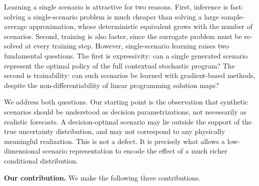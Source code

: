 Learning a single scenario is attractive for two reasons. First, inference is fast: solving a single-scenario problem is much cheaper than solving a large sample-average approximation, whose deterministic equivalent grows with the number of scenarios. Second, training is also faster, since the surrogate problem must be re-solved at every training step. However, single-scenario learning raises two fundamental questions. The first is expressivity: can a single generated scenario represent the optimal policy of the full contextual stochastic program? The second is trainability: can such scenarios be learned with gradient-based methods, despite the non-differentiability of linear programming solution maps?

We address both questions. Our starting point is the observation that synthetic scenarios should be understood as decision parametrizations, not necessarily as realistic forecasts. A decision-optimal scenario may lie outside the support of the true uncertainty distribution, and may not correspond to any physically meaningful realization. This is not a defect. It is precisely what allows a low-dimensional scenario representation to encode the effect of a much richer conditional distribution.

\textbf{Our contribution.}
We make the following three contributions.

